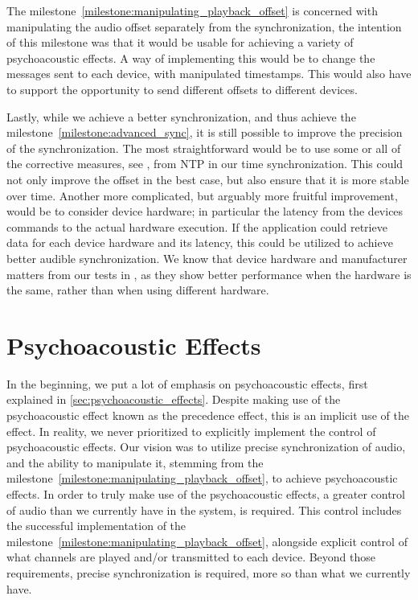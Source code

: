 \bigskip
The milestone~\ref{milestone:manipulating_playback_offset} is concerned with manipulating the audio offset separately from the synchronization, the intention of this milestone was that it would be usable for achieving a variety of psychoacoustic effects.
A way of implementing this would be to change the  messages sent to each device, with manipulated timestamps.
This would also have to support the opportunity to send different offsets to different devices.

\bigskip
Lastly, while we achieve a better synchronization, and thus achieve the milestone~\ref{milestone:advanced_sync}, it is still possible to improve the precision of the synchronization.
The most straightforward would be to use some or all of the corrective measures, see , from \ac{NTP} in our time synchronization.
This could not only improve the offset in the best case, but also ensure that it is more stable over time.
Another more complicated, but arguably more fruitful improvement, would be to consider device hardware; in particular the latency from the devices commands to the actual hardware execution.
If the application could retrieve data for each device hardware and its latency, this could be utilized to achieve better audible synchronization.
We know that device hardware and manufacturer matters from our tests in , as they show better performance when the hardware is the same, rather than when using different hardware.

\section{Psychoacoustic Effects}
In the beginning, we put a lot of emphasis on psychoacoustic effects, first explained in \cref{sec:psychoacoustic_effects}.
Despite making use of the psychoacoustic effect known as the precedence effect, this is an implicit use of the effect.
In reality, we never prioritized to explicitly implement the control of psychoacoustic effects.
Our vision was to utilize precise synchronization of audio, and the ability to manipulate it, stemming from the milestone~\ref{milestone:manipulating_playback_offset}, to achieve psychoacoustic effects.
In order to truly make use of the psychoacoustic effects, a greater control of audio than we currently have in the system, is required.
This control includes the successful implementation of the milestone~\ref{milestone:manipulating_playback_offset}, alongside explicit control of what channels are played and/or transmitted to each device.
Beyond those requirements, precise synchronization is required, more so than what we currently have.

